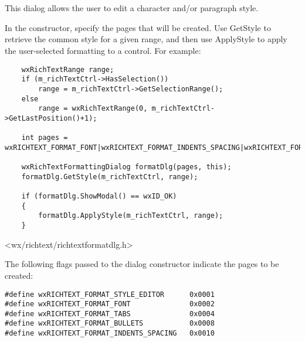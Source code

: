\section{}\label{wxrichtextformattingdialog}

This dialog allows the user to edit a character and/or paragraph style.

In the constructor, specify the pages that will be created. Use GetStyle
to retrieve the common style for a given range, and then use ApplyStyle
to apply the user-selected formatting to a control. For example:

\begin{verbatim}
    wxRichTextRange range;
    if (m_richTextCtrl->HasSelection())
        range = m_richTextCtrl->GetSelectionRange();
    else
        range = wxRichTextRange(0, m_richTextCtrl->GetLastPosition()+1);

    int pages = wxRICHTEXT_FORMAT_FONT|wxRICHTEXT_FORMAT_INDENTS_SPACING|wxRICHTEXT_FORMAT_TABS|wxRICHTEXT_FORMAT_BULLETS;

    wxRichTextFormattingDialog formatDlg(pages, this);
    formatDlg.GetStyle(m_richTextCtrl, range);

    if (formatDlg.ShowModal() == wxID_OK)
    {
        formatDlg.ApplyStyle(m_richTextCtrl, range);
    }
\end{verbatim}
 



<wx/richtext/richtextformatdlg.h>


The following flags passed to the dialog constructor indicate the pages to
be created:

\begin{verbatim}
#define wxRICHTEXT_FORMAT_STYLE_EDITOR      0x0001
#define wxRICHTEXT_FORMAT_FONT              0x0002
#define wxRICHTEXT_FORMAT_TABS              0x0004
#define wxRICHTEXT_FORMAT_BULLETS           0x0008
#define wxRICHTEXT_FORMAT_INDENTS_SPACING   0x0010
\end{verbatim}



\label{wxrichtextformattingdialogwxrichtextformattingdialog}

